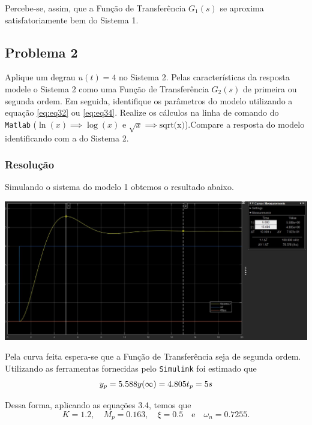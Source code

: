 \documentclass[
]{book}
\begin{document}
Percebe-se, assim, que a Função de Transferência \(G_1(s)\) se aproxima satisfatoriamente bem do Sistema 1.

\hypertarget{problema-2}{%
\subsection*{Problema 2}\label{problema-2}}

Aplique um degrau \(u(t) = 4\) no Sistema 2. Pelas características da resposta modele o Sistema 2 como uma Função de Transferência \(G_2(s)\) de primeira ou segunda ordem. Em seguida, identifique os parâmetros do modelo utilizando a equação \eqref{eq:eq32} ou \eqref{eq:eq34}. Realize os cálculos na linha de comando do \texttt{Matlab} (\(\ln{(x)} \implies \log{(x)}\) e \(\sqrt{x} \implies \text{sqrt(x)}\)).Compare a resposta do modelo identificando com a do Sistema 2.

\hypertarget{resoluuxe7uxe3o-1}{%
\subsubsection*{Resolução}\label{resoluuxe7uxe3o-1}}

Simulando o sistema do modelo 1 obtemos o resultado abaixo.

\includegraphics{Imagens/Lab3/Resolução/prob2A.jpg}

Pela curva feita espera-se que a Função de Transferência seja de segunda ordem. Utilizando as ferramentas fornecidas pelo \texttt{Simulink} foi estimado que
\[
y_p = 5.588\\
y(\infty) = 4.805 \\
t_p = 5s
\]

Dessa forma, aplicando as equações 3.4, temos que
\[
K = 1.2, \quad M_p = 0.163, \quad \xi = 0.5 \quad \text{e} \quad \omega_n = 0.7255.
\]
\end{document}
